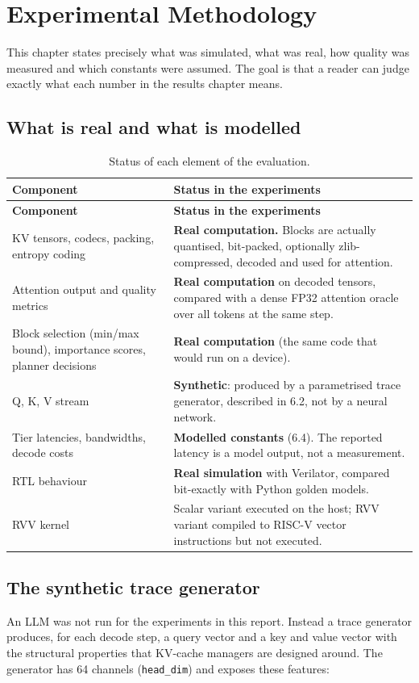 \documentclass[12pt,a4paper]{report}
\begin{document}
\section{Experimental Methodology}\label{sec:7}
This chapter states precisely what was simulated, what was real, how quality was measured and which constants were assumed. The goal is that a reader can judge exactly what each number in the results chapter means.

\subsection{What is real and what is modelled}\label{sec:7_1}
{\fontsize{8}{9.5}\selectfont\setlength{\tabcolsep}{3pt}
\begin{longtable}{>{\raggedright\arraybackslash}p{2.20in}>{\raggedright\arraybackslash}p{3.86in}}
\caption{Status of each element of the evaluation.}\\
\toprule
\textbf{Component} & \textbf{Status in the experiments} \\\midrule\endfirsthead
\toprule \textbf{Component} & \textbf{Status in the experiments} \\\midrule\endhead
\bottomrule\endfoot
KV tensors, codecs, packing, entropy coding & \textbf{Real computation.} Blocks are actually quantised, bit-packed, optionally zlib-compressed, decoded and used for attention. \\
Attention output and quality metrics & \textbf{Real computation} on decoded tensors, compared with a dense FP32 attention oracle over all tokens at the same step. \\
Block selection (min/max bound), importance scores, planner decisions & \textbf{Real computation} (the same code that would run on a device). \\
Q, K, V stream & \textbf{Synthetic}: produced by a parametrised trace generator, described in 6.2, not by a neural network. \\
Tier latencies, bandwidths, decode costs & \textbf{Modelled constants} (6.4). The reported latency is a model output, not a measurement. \\
RTL behaviour & \textbf{Real simulation} with Verilator, compared bit-exactly with Python golden models. \\
RVV kernel & Scalar variant executed on the host; RVV variant compiled to RISC-V vector instructions but not executed. \\
\bottomrule
\end{longtable}}
\subsection{The synthetic trace generator}\label{sec:7_2}
An LLM was not run for the experiments in this report. Instead a trace generator produces, for each decode step, a query vector and a key and value vector with the structural properties that KV-cache managers are designed around. The generator has 64 channels (\texttt{head\_\allowbreak{}\allowbreak{}dim}) and exposes these features:
\end{document}
